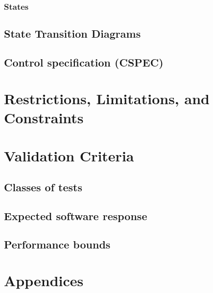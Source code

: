 \documentclass{article}
\begin{document}
\subsubsection{States}

\subsection{State Transition Diagrams}

\subsection{Control specification (CSPEC)}

\section{Restrictions, Limitations, and Constraints}

\section{Validation Criteria}

\subsection{Classes of tests}

\subsection{Expected software response}

\subsection{Performance bounds}

\section{Appendices}
\end{document}
